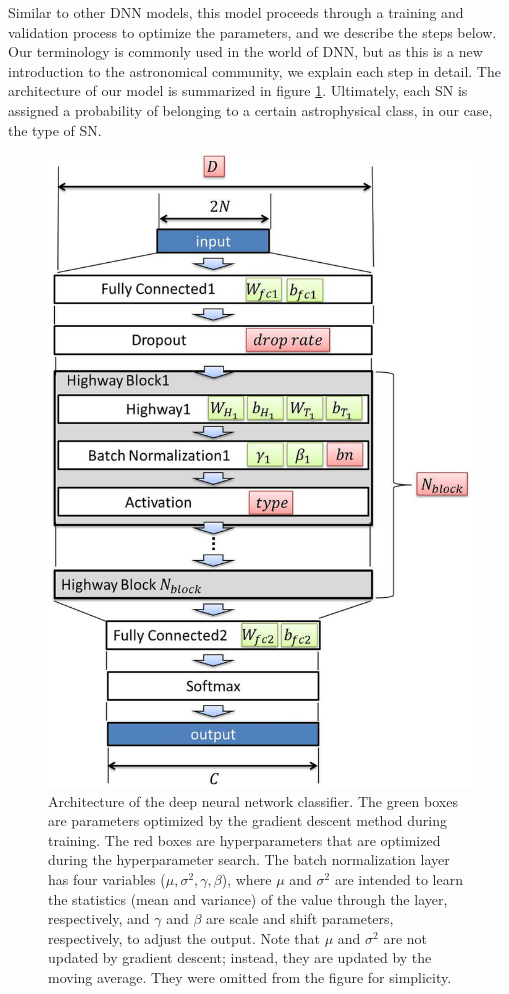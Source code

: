 \documentclass[useamsfonts]{pasj01}
\begin{document}
Similar to other DNN models, this model proceeds through a training and validation process to optimize the parameters, and we describe the steps below. Our terminology is commonly used in the world of DNN, but as this is a new introduction to the astronomical community, we explain each step in detail. The architecture of our model is summarized in figure \ref{fig:dnn_model}.
Ultimately, each SN is assigned a probability of belonging to a certain astrophysical class, in our case, the type of SN. 
%
\begin{figure}[htbp]
  \begin{center}
     \includegraphics[width=130mm]{figures/model_all.eps}
  \end{center}
  \caption{\label{dnnmodel}
  Architecture of the deep neural network classifier. 
  The green boxes are parameters optimized by the gradient descent method during training. 
  The red boxes are hyperparameters that are optimized during the hyperparameter search. 
  The batch normalization layer has four variables ($\mu, \sigma^2, \gamma, \beta$), where $\mu$ and $\sigma^2$ are intended to learn the statistics (mean and variance) of the value through the layer, respectively, and $\gamma$ and $\beta$ are scale and shift parameters, respectively, to adjust the output. 
  Note that $\mu$ and $\sigma^2$ are not updated by gradient descent; instead, they are updated by the moving average. 
  They were omitted from the figure for simplicity.
  }%
  \label{fig:dnn_model}
\end{figure}
\end{document}
